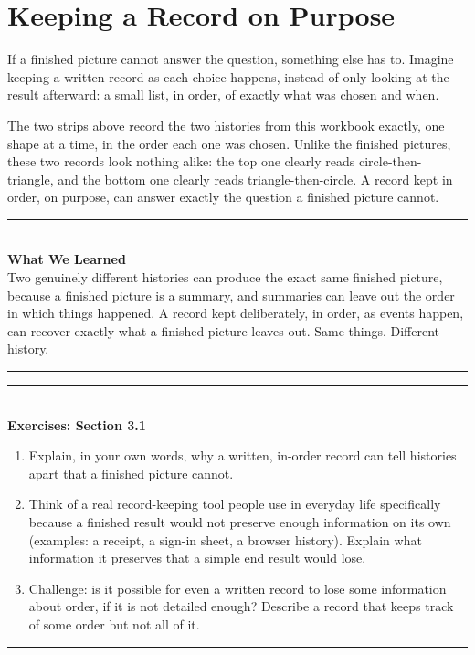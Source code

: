 \documentclass[11pt]{book}
\newenvironment{exercisebox}[1]{%
\vspace{0.8em}\noindent\rule{\linewidth}{0.6pt}\\[0.2em]\textbf{Exercises: #1}\\[0.3em]%
\begin{enumerate}[label=\arabic*., itemsep=0.4em]}%
{\end{enumerate}\noindent\rule{\linewidth}{0.6pt}\vspace{0.6em}}
\newenvironment{summarybox}{%
\vspace{0.6em}\noindent\rule{\linewidth}{0.6pt}\\[0.2em]\textbf{What We Learned}\\[0.3em]}%
{\\[0.2em]\noindent\rule{\linewidth}{0.6pt}\vspace{0.6em}}
\begin{document}
\section{Keeping a Record on Purpose}

If a finished picture cannot answer the question, something else has to. Imagine keeping a written record as each choice happens, instead of only looking at the result afterward: a small list, in order, of exactly what was chosen and when.

\begin{center}
\end{center}

The two strips above record the two histories from this workbook exactly, one shape at a time, in the order each one was chosen. Unlike the finished pictures, these two records look nothing alike: the top one clearly reads circle-then-triangle, and the bottom one clearly reads triangle-then-circle. A record kept in order, on purpose, can answer exactly the question a finished picture cannot.

\begin{summarybox}
Two genuinely different histories can produce the exact same finished picture, because a finished picture is a summary, and summaries can leave out the order in which things happened. A record kept deliberately, in order, as events happen, can recover exactly what a finished picture leaves out. Same things. Different history.
\end{summarybox}

\begin{exercisebox}{Section 3.1}
\item Explain, in your own words, why a written, in-order record can tell histories apart that a finished picture cannot.
\item Think of a real record-keeping tool people use in everyday life specifically because a finished result would not preserve enough information on its own (examples: a receipt, a sign-in sheet, a browser history). Explain what information it preserves that a simple end result would lose.
\item Challenge: is it possible for even a written record to lose some information about order, if it is not detailed enough? Describe a record that keeps track of some order but not all of it.
\end{exercisebox}
\end{document}
